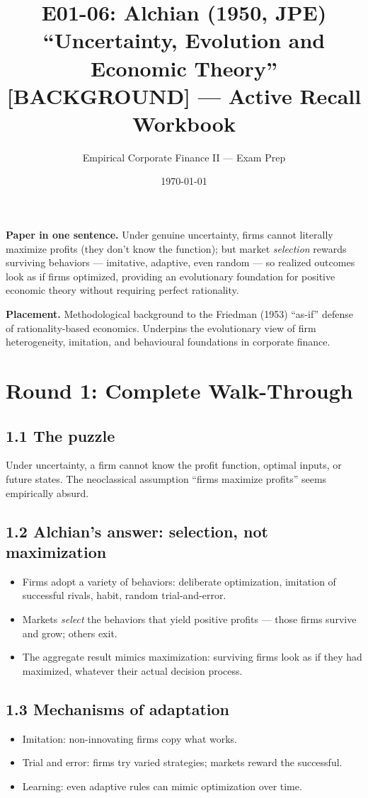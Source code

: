 \documentclass[11pt]{article}
\title{E01-06: Alchian (1950, JPE) \\
\large ``Uncertainty, Evolution and Economic Theory'' [BACKGROUND] --- Active Recall Workbook}
\author{Empirical Corporate Finance II --- Exam Prep}
\date{\today}
\begin{document}
\maketitle

\begin{keybox}
\textbf{Paper in one sentence.} Under genuine uncertainty, firms cannot literally maximize profits (they don't know the function); but market \emph{selection} rewards surviving behaviors --- imitative, adaptive, even random --- so realized outcomes look as if firms optimized, providing an evolutionary foundation for positive economic theory without requiring perfect rationality.

\textbf{Placement.} Methodological background to the Friedman (1953) ``as-if'' defense of rationality-based economics. Underpins the evolutionary view of firm heterogeneity, imitation, and behavioural foundations in corporate finance.
\end{keybox}

\section*{Round 1: Complete Walk-Through}

\subsection*{1.1 The puzzle}
Under uncertainty, a firm cannot know the profit function, optimal inputs, or future states. The neoclassical assumption ``firms maximize profits'' seems empirically absurd.

\subsection*{1.2 Alchian's answer: selection, not maximization}
\begin{itemize}
\item Firms adopt a variety of behaviors: deliberate optimization, imitation of successful rivals, habit, random trial-and-error.
\item Markets \emph{select} the behaviors that yield positive profits --- those firms survive and grow; others exit.
\item The aggregate result mimics maximization: surviving firms look as if they had maximized, whatever their actual decision process.
\end{itemize}

\subsection*{1.3 Mechanisms of adaptation}
\begin{itemize}
\item Imitation: non-innovating firms copy what works.
\item Trial and error: firms try varied strategies; markets reward the successful.
\item Learning: even adaptive rules can mimic optimization over time.
\end{itemize}
\end{document}
